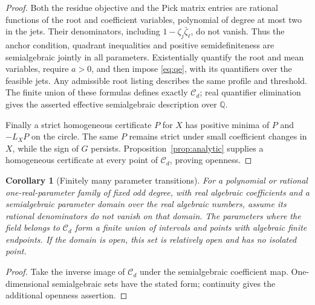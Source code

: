 \documentclass[11pt,a4paper]{article}
\newtheorem{corollary}[theorem]{Corollary}
\theoremstyle{remark}\newtheorem{remark}[theorem]{Remark}
\begin{document}
\begin{proof}
Both the residue objective and the Pick matrix entries are rational
functions of the root and coefficient variables, polynomial of degree at
most two in the jets. Their denominators, including
\(1-\zeta_j\bar\zeta_\ell\), do not vanish. Thus the anchor condition,
quadrant inequalities and positive semidefiniteness are semialgebraic
jointly in all parameters. Existentially quantify the root and mean
variables, require \(a>0\), and then impose \eqref{eq:qe}, with its
quantifiers over the feasible jets. Any admissible root listing describes
the same profile and threshold. The finite union of these formulas
defines exactly \(\mathcal C_d\); real quantifier elimination gives
the asserted effective semialgebraic description over \(\mathbb Q\).

Finally a strict homogeneous certificate \(P\) for \(X\) has positive
minima of \(P\) and \(-L_XP\) on the circle. The same \(P\) remains
strict under small coefficient changes in \(X\), while the sign of
\(G\) persists. Proposition~\ref{prop:analytic} supplies a homogeneous
certificate at every point of \(\mathcal C_d\), proving openness.
\end{proof}

\begin{corollary}[Finitely many parameter transitions]\label{cor:transitions}
For a polynomial or rational one-real-parameter family of fixed odd
degree, with real algebraic coefficients and a semialgebraic parameter
domain over the real algebraic numbers, assume its rational denominators
do not vanish on that domain. The parameters where the field belongs
to \(\mathcal C_d\) form a finite union of intervals and points with
algebraic finite endpoints. If the domain is open, this set is relatively
open and has no isolated point.
\end{corollary}
\begin{proof}
Take the inverse image of \(\mathcal C_d\) under the semialgebraic
coefficient map. One-dimensional semialgebraic sets have the stated
form; continuity gives the additional openness assertion.
\end{proof}
\end{document}
